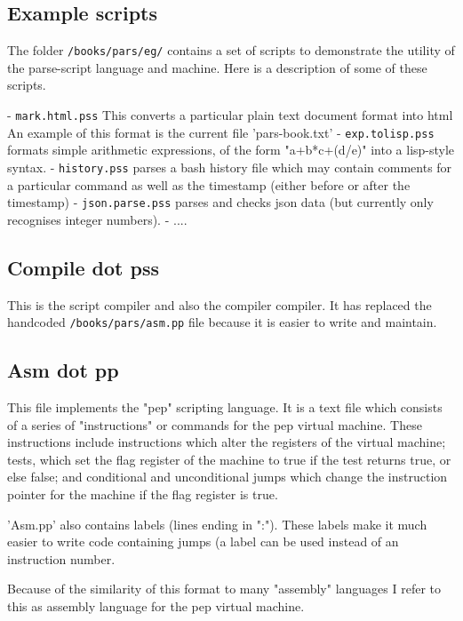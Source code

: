 \documentclass[a4paper,12pt]{article}
\begin{document}
\subsection{Example scripts}

   The folder \texttt{/books/pars/eg/} contains a set of scripts to demonstrate
   the utility of the parse-script language and machine. Here is a
   description of some of these scripts.

   - \texttt{mark.html.pss}
      This converts a particular plain text document format into html
      An example of this format is the current file 'pars-book.txt'
   - \texttt{exp.tolisp.pss}
      formats simple arithmetic expressions, of the form
      "a+b*c+(d/e)" into a lisp-style syntax.
   - \texttt{history.pss}
      parses a bash history file which may contain comments for
      a particular command as well as the timestamp (either
      before or after the timestamp)
   - \texttt{json.parse.pss}
      parses and checks json data (but currently only recognises
      integer numbers).
   - ....

\subsection{Compile dot pss}

  This is the script compiler and also the compiler compiler. It has replaced
  the handcoded \texttt{/books/pars/asm.pp} file because it is easier to write and maintain.

\subsection{Asm dot pp}

  This file implements the "pep" scripting language. It is a text file which
  consists of a series of "instructions" or commands for the pep virtual
  machine. These instructions include instructions which alter the registers of
  the virtual machine; tests, which set the flag register of the machine to
  true if the test returns true, or else false; and conditional and
  unconditional jumps which change the instruction pointer for the machine if
  the flag register is true.
  
  'Asm.pp' also contains labels (lines ending in ":"). These labels make
  it much easier to write code containing jumps (a label can be used
  instead of an instruction number.

  Because of the similarity of this format to many "assembly" languages
  I refer to this as assembly language for the pep virtual machine.
\end{document}
